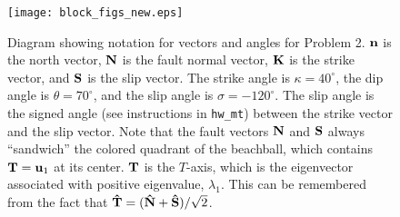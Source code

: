 \begin{figure}
\centering
\texttt{[image: block\_figs\_new.eps]}
\caption[]
{{
Diagram showing notation for vectors and angles for Problem 2.
$\mbox{${\bf n}$}$ is the north vector, $\mbox{${\bf N}$}$ is the fault normal vector, $\mbox{${\bf K}$}$ is the strike vector, and $\mbox{${\bf S}$}$ is the slip vector.
The strike angle is $\kappa = 40^\circ$, the dip angle is $\theta = 70^\circ$, and the slip angle is $\sigma = -120^\circ$.
The slip angle is the signed angle (see instructions in {\tt hw\_mt}) between the strike vector and the slip vector.
Note that the fault vectors $\mbox{${\bf N}$}$ and $\mbox{${\bf S}$}$ always ``sandwich'' the colored quadrant of the beachball, which contains $\mbox{${\bf T}$} = \mbox{${\bf u}$}_1$ at its center.
$\mbox{${\bf T}$}$ is the $T$-axis, which is the eigenvector associated with positive eigenvalue, $\lambda_1$.
This can be remembered from the fact that $\mbox{\boldmath{$\hat{\rm T}$}} = (\mbox{\boldmath{$\hat{\rm N}$}} + \mbox{\boldmath{$\hat{\rm S}$}})/\sqrt{2}$.
\label{fig:cmt}
}}
\end{figure}
